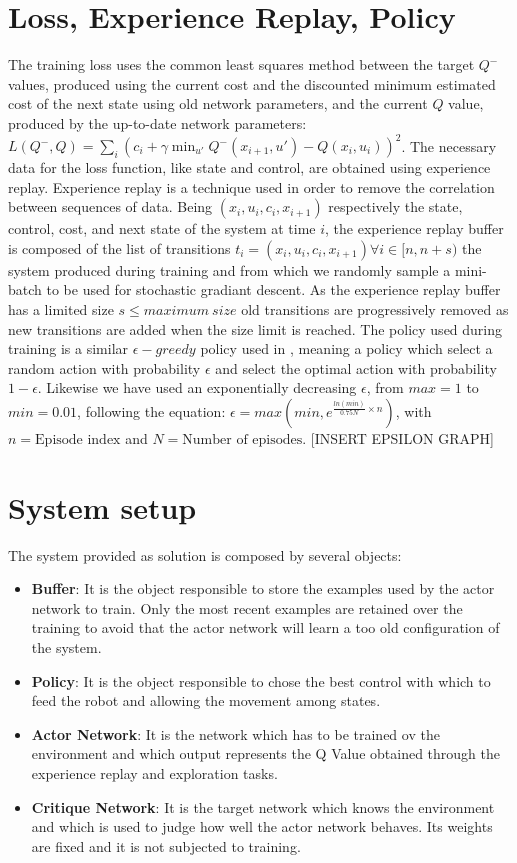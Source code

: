 \documentclass[twocolumn, a4paper]{article}
\begin{document}
\section{Loss, Experience Replay, Policy}
The training loss uses the common least squares method between the target \(Q^{-}\) values, produced using the current cost and the discounted minimum estimated cost of the next state using old network parameters, and the current \(Q\) value, produced by the up-to-date network parameters: \(L(Q^{-},Q)=\sum_{i}(c_{i}+\gamma\min_{u'}Q^{-}(x_{i+1},u')-Q(x_{i},u_{i}))^{2}\).
The necessary data for the loss function, like state and control, are obtained using experience replay.
Experience replay is a technique used in order to remove the correlation between sequences of data.
Being \((x_{i}, u_{i}, c_{i}, x_{i+1})\) respectively the state, control, cost, and next state of the system at time \(i\), the experience replay buffer is composed of the list of transitions \({t_{i}=(x_{i}, u_{i}, c_{i}, x_{i+1}) \forall i\in [n, n+s)}\) the system produced during training and from which we randomly sample a mini-batch to be used for stochastic gradiant descent.
As the experience replay buffer has a limited size \(s\leq maximum\:size\) old transitions are progressively removed as new transitions are added when the size limit is reached.
The policy used during training is a similar \(\epsilon-greedy\) policy used in \cite{Mnih}, meaning a policy which select a random action with probability \(\epsilon\) and select the optimal action with probability \(1-\epsilon\).
Likewise \cite{Mnih} we have used an exponentially decreasing \(\epsilon\), from \(max=1\) to \(min=0.01\), following the equation: \(\epsilon=max(min,e^{\frac{ln(min)}{0.75N}\times n})\), with \(n=\text{Episode index}\) and \(N=\text{Number of episodes}\).
[INSERT EPSILON GRAPH]

\section{System setup}
The system provided as solution is composed by several objects:
\begin{itemize}
	\item \textbf{Buffer}: It is the object responsible to store the examples
		used by the actor network to train. Only the most recent examples are
		retained over the training to avoid that the actor network will learn
		a too old configuration of the system.
	\item \textbf{Policy}: It is the object responsible to chose the best
		control with which to feed the robot and allowing the movement among
		states.
	\item \textbf{Actor Network}: It is the network which has to be trained
		ov the environment and which output represents the Q Value obtained
		through the experience replay and exploration tasks.
	\item \textbf{Critique Network}: It is the target network which knows the
		environment and which is used to judge how well the actor network
		behaves. Its weights are fixed and it is not subjected to training. 
\end{itemize}
\end{document}
